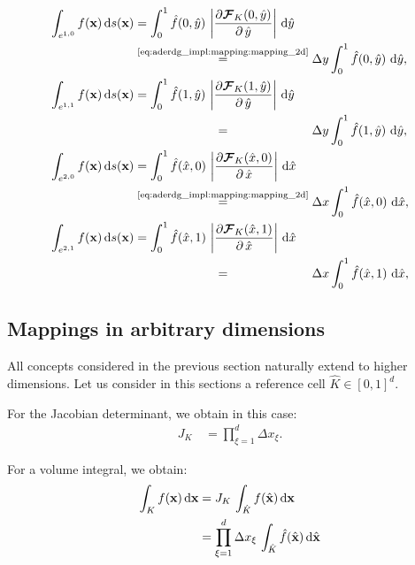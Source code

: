 \documentclass{scrreprt}
\theoremstyle{definition}
\theoremstyle{nonumberplain}
\renewcommand{\vec}[1]{{\textbf{#1}}}
\newcommand{\cell}{K}
\newcommand{\face}{e}
\newcommand{\dV}{\text{d}\vec{x}}
\newcommand{\ds}{\text{d}s}
\newcommand{\refVec}[1]{\hat{\vec{#1}}}
\newcommand{\refCell}{\hat{\cell}}
\newcommand{\mapping}{\boldsymbol{\mathcal{F}}_{\cell}}
\newcommand{\detJ}{J_\cell}
\newcommand{\refdV}{\textup{d}\hat{\vec{x}}}
\newcommand{\refdx}{\textup{d}\hat{x}}
\newcommand{\refdy}{\textup{d}\hat{y}}
\begin{document}
\begin{align}
\int_{\face^{1,0}} f(\vec{x})\,\ds(\vec{x}) &=
\int_{0}^1\hat{f}(0,\hat{y})\,\left|\frac{\partial
\mapping(0,\hat{y})}{\partial\,\hat{y}}\right|\,\refdy
\notag\\
&\overset{\textup{\eqref{eq:aderdg_impl:mapping:mapping_2d}}}{=}
\Delta y
\int_{0}^1\hat{f}(0,\hat{y})\,\,\refdy,
\\
\int_{\face^{1,1}} f(\vec{x})\,\ds(\vec{x}) &=
\int_{0}^1\hat{f}(1,\hat{y})\,\left|\frac{\partial
\mapping(1,\hat{y})}{\partial\,\hat{y}}\right|\,\refdy
\notag\\
&\overset{\phantom{\textup{\eqref{eq:aderdg_impl:mapping:mapping_2d}}}}{=}
\Delta y
\int_{0}^1\hat{f}(1,\hat{y})\,\,\refdy,
\\
\int_{\face^{2,0}} f(\vec{x})\,\ds(\vec{x}) &=
\int_{0}^1\hat{f}(\hat{x},0)\,\left|\frac{\partial
\mapping(\hat{x},0)}{\partial\,\hat{x}}\right|\,\refdx
\notag\\
&\overset{\textup{\eqref{eq:aderdg_impl:mapping:mapping_2d}}}{=}
\Delta x
\int_{0}^1\hat{f}(\hat{x},0)\,\,\refdx,
\\
\int_{\face^{2,1}} f(\vec{x})\,\ds(\vec{x}) &=
\int_{0}^1\hat{f}(\hat{x},1)\,\left|\frac{\partial
\mapping(\hat{x},1)}{\partial\,\hat{x}}\right|\,\refdx
\notag
\\
&\overset{\phantom{\textup{\eqref{eq:aderdg_impl:mapping:mapping_2d}}}}{=}
\Delta x
\int_{0}^1\hat{f}(\hat{x},1)\,\,\refdx,
\end{align}

\subsection{Mappings in arbitrary dimensions}

All concepts considered in the previous section naturally extend to
higher dimensions.
Let us consider in this sections a reference cell $\refCell\in[0,1]^d$.

For the Jacobian determinant, we obtain in this case:
\begin{align}
\detJ\,
&=
\prod_{\xi=1}^{d}
\Delta x_\xi.
\end{align}

For a volume integral, we obtain:
\begin{align}
\label{eq:ader_impl:mappings:volume_integral}
\int_\cell f(\vec{x})\,\dV
&=
\detJ\,
\int_{\refCell} f(\refVec{x})\,\dV
\notag
\\
&=
\prod_{\xi=1}^{d}
\Delta x_\xi
\,
\int_{\refCell} \hat{f}(\refVec{x})\,\refdV
\end{align}
\end{document}
